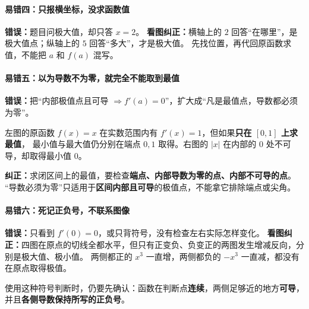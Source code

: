 \clearpage
\begin{trapbox}
\paragraph{易错四：只报横坐标，没求函数值}
\begin{center}\end{center}

\textbf{错误：}题目问极大值，却只答 $x=2$。
\textbf{看图纠正：}横轴上的 $2$ 回答“在哪里”，是极大值点；纵轴上的 $5$ 回答“多大”，才是极大值。
先找位置，再代回原函数求值，不能把 $a$ 和 $f(a)$ 混写。
\end{trapbox}
\clearpage
\begin{trapbox}
\paragraph{易错五：以为导数不为零，就完全不能取到最值}
\begin{center}\end{center}

\textbf{错误：}把“内部极值点且可导 $\Rightarrow f'(a)=0$”，扩大成“凡是最值点，导数都必须为零”。

左图的原函数 $f(x)=x$ 在实数范围内有 $f'(x)=1$，但如果\textbf{只在 $[0,1]$ 上求最值}，
最小值与最大值仍分别在端点 $0,1$ 取得。右图的 $|x|$ 在内部的 $0$ 处不可导，却取得最小值 $0$。

\textbf{纠正：}求闭区间上的最值，要检查\textbf{端点、内部导数为零的点、内部不可导的点}。
“导数必须为零”只适用于\textbf{区间内部且可导}的极值点，不能拿它排除端点或尖角。
\end{trapbox}
\clearpage
\begin{trapbox}
\paragraph{易错六：死记正负号，不联系图像}
\begin{center}\end{center}

\textbf{错误：}只看到 $f'(0)=0$，或只背符号，没有检查左右实际怎样变化。
\textbf{看图纠正：}四图在原点的切线全都水平，但只有正变负、负变正的两图发生增减反向，分别是极大值、极小值。
两侧都正的 $x^3$ 一直增，两侧都负的 $-x^3$ 一直减，都没有在原点取得极值。

使用这种符号判断时，仍要先确认：函数在判断点\textbf{连续}，两侧足够近的地方\textbf{可导}，并且\textbf{各侧导数保持所写的正负号}。
\end{trapbox}
